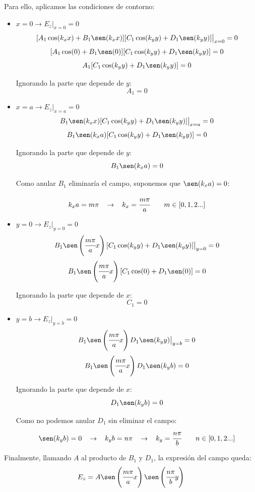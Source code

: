 \documentclass[12pt]{article}
\begin{document}
Para ello, aplicamos las condiciones de contorno:
\begin{itemize}
	\item $x=0 \rightarrow E_z\big|_{x=0} = 0$
	$$[A_1 \cos(k_xx) + B_1\sen(k_xx)][C_1\cos(k_yy) + D_1\sen(k_yy)]\big|_{x=0} = 0$$
	$$[A_1 \cos(0) + B_1\sen(0)][C_1\cos(k_yy) + D_1\sen(k_yy)] = 0$$
	$$A_1[C_1\cos(k_yy) + D_1\sen(k_yy)] = 0$$
	
	Ignorando la parte que depende de $y$:
	$$A_1 = 0$$
	
	\item $x=a \rightarrow E_z\big|_{x=a} = 0$
	$$B_1\sen(k_xx)[C_1\cos(k_yy) + D_1\sen(k_yy)]\big|_{x=a} = 0$$
	$$B_1\sen(k_xa)[C_1\cos(k_yy) + D_1\sen(k_yy)] = 0$$
	
	Ignorando la parte que depende de $y$:
	$$B_1\sen(k_xa) = 0$$
	
	Como anular $B_1$ eliminar\'ia el campo, suponemos que $\sen(k_xa) = 0$:
	
	$$k_xa = m\pi \hspace{0.3cm}\rightarrow \hspace{0.3cm} k_x = \cfrac{m\pi}{a} \hspace{7mm} m \in [0,1,2...]$$
	\item $y=0 \rightarrow E_z\big|_{y=0} = 0$
	$$B_1\sen\left(\cfrac{m\pi}{a}x\right)[C_1\cos(k_yy) + D_1\sen(k_yy)]\big|_{y=0} = 0$$
	$$B_1\sen\left(\cfrac{m\pi}{a}x\right)[C_1\cos(0) + D_1\sen(0)] = 0$$

	Ignorando la parte que depende de $x$:
	$$C_1 = 0$$
	
	\item $y=b \rightarrow E_z\big|_{y=b} = 0$
	$$B_1\sen\left(\cfrac{m\pi}{a}x\right)D_1\sen(k_yy)\big|_{y=b} = 0$$
	$$B_1\sen\left(\cfrac{m\pi}{a}x\right)D_1\sen(k_yb)= 0$$

	Ignorando la parte que depende de $x$:
	$$D_1\sen(k_yb)= 0$$
	
	Como no podemos anular $D_1$ sin eliminar el campo:
	$$\sen(k_yb)= 0 \hspace{0.3cm}\rightarrow \hspace{0.3cm} k_yb = n\pi \hspace{0.3cm}\rightarrow \hspace{0.3cm} k_y = \cfrac{n\pi}{b} \hspace{7mm} n \in [0,1,2...]$$
\end{itemize}

Finalmente, llamando $A$ al producto de $B_1$ y $D_1$, la expresi\'on del campo queda:
$$E_z = A\sen\left(\cfrac{m\pi}{a}x\right)\sen\left(\cfrac{n\pi}{b}y\right)$$
\end{document}
